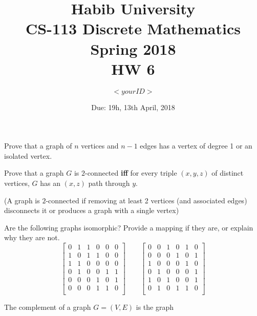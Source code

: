 \documentclass[addpoints]{exam}
\title{Habib University\\CS-113 Discrete Mathematics\\Spring 2018\\HW 6}
\author{$<your ID>$}  %
\date{Due: 19h, 13th April, 2018}
\begin{document}
\maketitle

\begin{questions}



\question
Prove that a graph of $n$ vertices and $n-1$ edges has a vertex of degree 1 or an isolated vertex.
  \begin{solution}
  \end{solution}

\question 
Prove that a graph $G$ is $2$-connected \textbf{iff} for every triple $(x,y,z)$ of distinct vertices, $G$ has an $(x,z)$ path through $y$.

(A graph is $2$-connected if removing at least 2 vertices (and associated edges) disconnects it or produces a graph with a single vertex)  


  \begin{solution}
  \end{solution}
  
\question 
Are the following graphs isomorphic? Provide a mapping if they are, or explain why they are not.
\[
\begin{bmatrix}
0 & 1 & 1 & 0 & 0 & 0\\
1 & 0 & 1 & 1 & 0 & 0\\
1 & 1 & 0 & 0 & 0 & 0\\
0 & 1 & 0 & 0 & 1 & 1\\
0 & 0 & 0 & 1 & 0 & 1\\
0 & 0 & 0 & 1 & 1 & 0\\
\end{bmatrix}
\qquad
\begin{bmatrix}
0 & 0 & 1 & 0 & 1 & 0\\
0 & 0 & 0 & 1 & 0 & 1\\
1 & 0 & 0 & 0 & 1 & 0\\
0 & 1 & 0 & 0 & 0 & 1\\
1 & 0 & 1 & 0 & 0 & 1\\
0 & 1 & 0 & 1 & 1 & 0\\
\end{bmatrix}
\]

  \begin{solution}
  \end{solution}

\question
The complement of a graph $G = (V,E)$ is the graph 


\end{questions}
\end{document}
